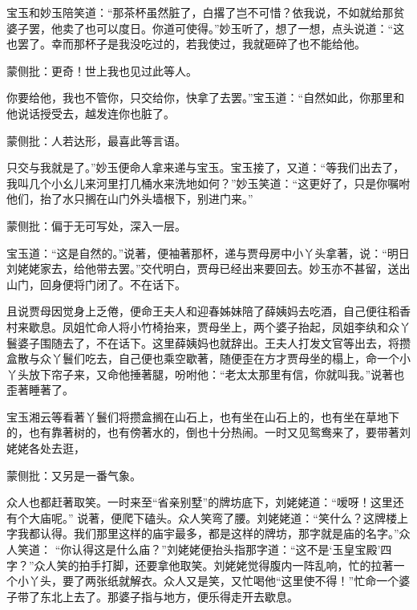 \begin{parag}
\end{parag}


\begin{parag}


    宝玉和妙玉陪笑道：“那茶杯虽然脏了，白撂了岂不可惜？依我说，不如就给那贫婆子罢，他卖了也可以度日。你道可使得。”妙玉听了，想了一想，点头说道：“这也罢了。幸而那杯子是我没吃过的，若我使过，我就砸碎了也不能给他。\begin{note}蒙侧批：更奇！世上我也见过此等人。\end{note}你要给他，我也不管你，只交给你，快拿了去罢。”宝玉道：“自然如此，你那里和他说话授受去，越发连你也脏了。\begin{note}蒙侧批：人若达形，最喜此等言语。\end{note}只交与我就是了。”妙玉便命人拿来递与宝玉。宝玉接了，又道：“等我们出去了，我叫几个小幺儿来河里打几桶水来洗地如何？”妙玉笑道：“这更好了，只是你嘱咐他们，抬了水只搁在山门外头墙根下，别进门来。”\begin{note}蒙侧批：偏于无可写处，深入一层。\end{note}宝玉道：“这是自然的。”说著，便袖著那杯，递与贾母房中小丫头拿著，说：“明日刘姥姥家去，给他带去罢。”交代明白，贾母已经出来要回去。妙玉亦不甚留，送出山门，回身便将门闭了。不在话下。
\end{parag}


\begin{parag}


    且说贾母因觉身上乏倦，便命王夫人和迎春姊妹陪了薛姨妈去吃酒，自己便往稻香村来歇息。凤姐忙命人将小竹椅抬来，贾母坐上，两个婆子抬起，凤姐李纨和众丫鬟婆子围随去了，不在话下。这里薛姨妈也就辞出。王夫人打发文官等出去，将攒盒散与众丫鬟们吃去，自己便也乘空歇著，随便歪在方才贾母坐的榻上，命一个小丫头放下帘子来，又命他捶著腿，吩咐他：“老太太那里有信，你就叫我。”说著也歪著睡著了。
\end{parag}


\begin{parag}


    宝玉湘云等看著丫鬟们将攒盒搁在山石上，也有坐在山石上的，也有坐在草地下的，也有靠著树的，也有傍著水的，倒也十分热闹。一时又见鸳鸯来了，要带著刘姥姥各处去逛，\begin{note}蒙侧批：又另是一番气象。\end{note}众人也都赶著取笑。一时来至“省亲别墅”的牌坊底下，刘姥姥道：“嗳呀！这里还有个大庙呢。” 说著，便爬下磕头。众人笑弯了腰。刘姥姥道：“笑什么？这牌楼上字我都认得。我们那里这样的庙宇最多，都是这样的牌坊，那字就是庙的名字。”众人笑道： “你认得这是什么庙？”刘姥姥便抬头指那字道：“这不是‘玉皇宝殿’四字？”众人笑的拍手打脚，还要拿他取笑。刘姥姥觉得腹内一阵乱响，忙的拉著一个小丫头，要了两张纸就解衣。众人又是笑，又忙喝他“这里使不得！”忙命一个婆子带了东北上去了。那婆子指与地方，便乐得走开去歇息。
\end{parag}


